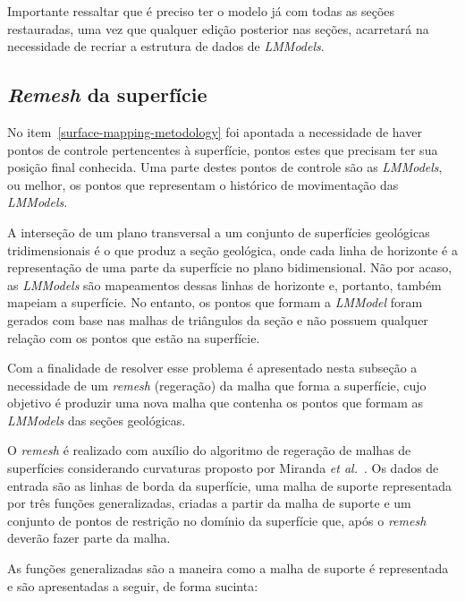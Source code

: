 Importante ressaltar que é preciso ter o modelo já com todas as seções restauradas, uma vez que qualquer edição posterior nas seções, acarretará na necessidade de recriar a estrutura de dados de \textit{LMModels}.

\subsection{\textit{Remesh} da superfície}\label{surface-remesh}

No item~\ref{surface-mapping-metodology} foi apontada a necessidade de haver pontos de controle pertencentes à superfície, pontos estes que precisam ter sua posição final conhecida. Uma parte destes pontos de controle são as \textit{LMModels}, ou melhor, os pontos que representam o histórico de movimentação das \textit{LMModels}.

A interseção de um plano transversal a um conjunto de superfícies geológicas tridimensionais é o que produz a seção geológica, onde cada linha de horizonte é a representação de uma parte da superfície no plano bidimensional. Não por acaso, as \textit{LMModels} são mapeamentos dessas linhas de horizonte e, portanto, também mapeiam a superfície. No entanto, os pontos que formam a \textit{LMModel} foram gerados com base nas malhas de triângulos da seção e não possuem qualquer relação com os pontos que estão na superfície.

Com a finalidade de resolver esse problema é apresentado nesta subseção a necessidade de um \textit{remesh} (regeração) da malha que forma a superfície, cujo objetivo é produzir uma nova malha que contenha os pontos que formam as \textit{LMModels} das seções geológicas.

O \textit{remesh} é realizado com auxílio do algoritmo de regeração de malhas de superfícies considerando curvaturas proposto por Miranda \textit{et al.}~\cite{Miranda}. Os dados de entrada são as linhas de borda da superfície, uma malha de suporte representada por três funções generalizadas, criadas a partir da malha de suporte e um conjunto de pontos de restrição no domínio da superfície que, após o \textit{remesh} deverão fazer parte da malha.

As funções generalizadas são a maneira como a malha de suporte é representada e são apresentadas a seguir, de forma sucinta:

